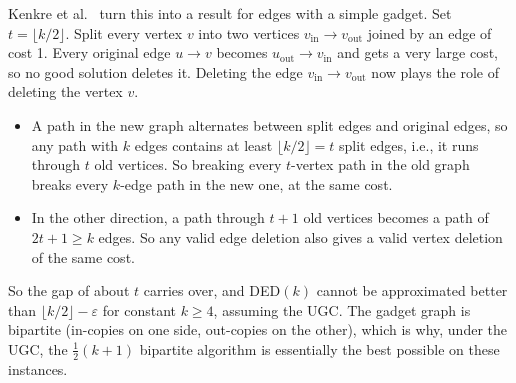 \documentclass[sigconf,nonacm]{acmart}
\newcommand{\DED}{\textsc{DED}}
\begin{document}
 Kenkre et al.~\cite{kpps} turn this into a result for edges with a simple gadget. Set $t=\lfloor k/2\rfloor$. Split every vertex $v$ into two vertices $v_{\text{in}}\to v_{\text{out}}$ joined by an edge of cost 1. Every original edge $u\to v$ becomes $u_{\text{out}}\to v_{\text{in}}$ and gets a very large cost, so no good solution deletes it. Deleting the edge $v_{\text{in}}\to v_{\text{out}}$ now plays the role of deleting the vertex $v$.
\begin{itemize}
\item A path in the new graph alternates between split edges and original edges, so any path with $k$ edges contains at least $\lfloor k/2\rfloor=t$ split edges, i.e., it runs through $t$ old vertices. So breaking every $t$-vertex path in the old graph breaks every $k$-edge path in the new one, at the same cost.
\item In the other direction, a path through $t+1$ old vertices becomes a path of $2t+1\ge k$ edges. So any valid edge deletion also gives a valid vertex deletion of the same cost.
\end{itemize}
So the gap of about $t$ carries over, and \DED$(k)$ cannot be approximated better than $\lfloor k/2\rfloor-\varepsilon$ for constant $k\ge4$, assuming the UGC. The gadget graph is bipartite (in-copies on one side, out-copies on the other), which is why, under the UGC, the $\frac12(k+1)$ bipartite algorithm is essentially the best possible on these instances.
\end{document}
